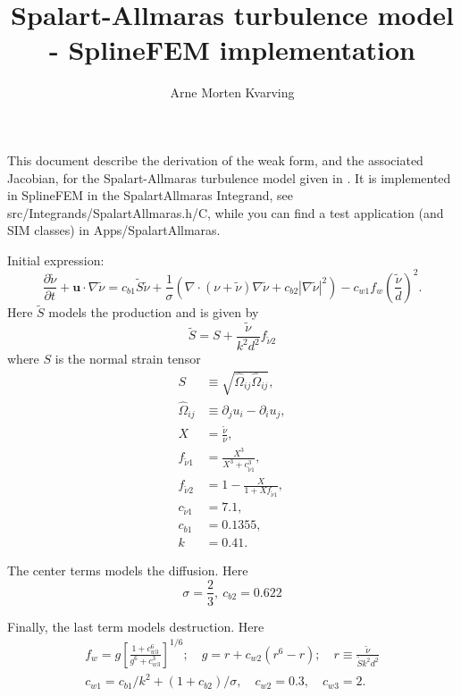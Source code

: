 \documentclass[twoside, 11pt, a4paper]{article}
\title{Spalart-Allmaras turbulence model - SplineFEM implementation}
\author{Arne Morten Kvarving}
\begin{document}
\maketitle
This document describe the derivation of the weak form, and the associated
Jacobian, for the Spalart-Allmaras turbulence model given in \cite{sa}.
It is implemented in SplineFEM in the SpalartAllmaras
Integrand, see src/Integrands/SpalartAllmaras.h/C, while
you can find a test application (and SIM classes) in Apps/SpalartAllmaras.

Initial expression:
\begin{equation}
	\frac{\partial\tilde{\nu}}{\partial t} + \mathbf{u}\cdot\nabla\tilde{\nu} = c_{b1}\tilde{S}\tilde{\nu}+\frac{1}{\sigma}\left(\nabla\cdot\left(\nu + \tilde{\nu}\right)\nabla\tilde{\nu} + c_{b2}\left|\nabla\tilde{\nu}\right|^2\right) - c_{w1}f_w\left(\frac{\tilde{\nu}}{d}\right)^2.
\end{equation}
Here $\tilde{S}$ models the production and is given by
\begin{equation}
	\tilde{S} = S + \frac{\tilde{\nu}}{k^2d^2}f_{\tilde{\nu}2}
\end{equation}
where $S$ is the normal strain tensor
\begin{equation}
	\begin{split}
		S &\equiv \sqrt{\hat{\Omega}_{ij}\hat{\Omega}_{ij}}, \\
		\hat{\Omega}_{ij} &\equiv \partial_j u_i - \partial_i u_j, \\
		X &= \frac{\tilde{\nu}}{\nu}, \\
		f_{\tilde{\nu}1} &= \frac{X^3}{X^3+c_{\tilde{\nu}1}^3}, \\
		f_{\tilde{\nu}2} &= 1-\frac{X}{1+Xf_{\tilde{\nu}1}}, \\
		c_{\tilde{\nu}1} &= 7.1, \\
		c_{b1} &= 0.1355, \\
		k &= 0.41.
	\end{split}
\end{equation}

The center terms models the diffusion. Here
\begin{equation}
	\sigma = \frac{2}{3},\ c_{b2} = 0.622
\end{equation}

Finally, the last term models destruction. Here
\begin{equation}
	\begin{split}
		f_w = g\left[\frac{1+c_{w3}^6}{g^6+c_{w3}^3}\right]^{1/6}; \quad g = r + c_{w2}\left(r^6-r\right); \quad r \equiv \frac{\tilde{\nu}}{\tilde{S}k^2d^2} \\
		c_{w1} = c_{b1}/k^2+(1+c_{b2})/\sigma,\quad c_{w2} = 0.3,\quad c_{w3} = 2.
	\end{split}
\end{equation}
\end{document}
